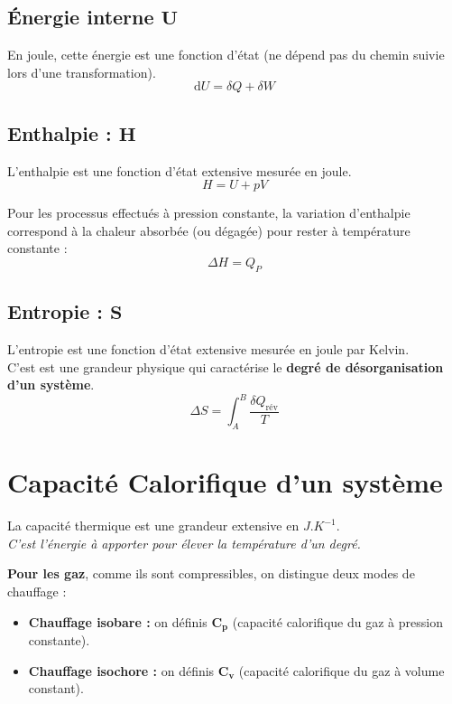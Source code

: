 \documentclass[a4paper,12pt]{article}
\newcommand{\diff}{\mathrm{d}} %
\begin{document}
\begin{multicols}{2}
\subsection*{Énergie interne $\bm{U}$}
En joule, cette énergie est une fonction d'état (ne dépend pas du chemin suivie lors d'une transformation).
$$ \boxed{\diff U = \delta Q + \delta W} $$

\subsection*{Enthalpie : $\bm{H}$}
L'enthalpie est une fonction d'état extensive mesurée en joule.
$$ \boxed{H = U + pV} $$

Pour les processus effectués à pression constante, la variation d'enthalpie correspond à la chaleur absorbée (ou dégagée) pour rester à température constante : 
$$ \Delta H = Q_P $$


\subsection*{Entropie : $\bm{S}$}
L'entropie est une fonction d'état extensive mesurée en joule par Kelvin.\\
C'est est une grandeur physique qui caractérise le \textbf{degré de désorganisation d'un système}.
$$ \boxed{\Delta S = \int_{A}^{B} \dfrac{\delta Q_{\text{rév}}}{T}} $$


\end{multicols}


\section{Capacité Calorifique d'un système}

La capacité thermique est une grandeur extensive en $J.K^{-1}$.\\
\textit{C'est l'énergie à apporter pour élever la température d'un degré.}
\vspace{3mm}

\textbf{Pour les gaz}, comme ils sont compressibles, on distingue deux modes de chauffage :
\vspace{3pt}
\begin{itemize}[label=\textbullet]
    \item \textbf{Chauffage isobare :} on définis $\bm{C_p}$ (capacité calorifique du gaz à pression constante).
    \item \textbf{Chauffage isochore :} on définis $\bm{C_v}$ (capacité calorifique du gaz à volume constant).
\end{itemize}
\end{document}
